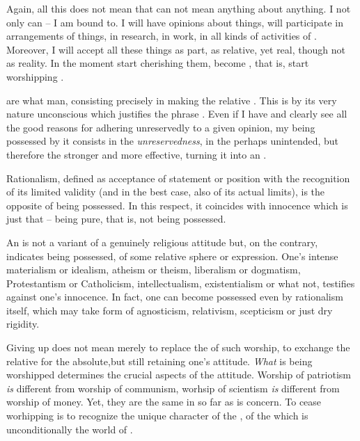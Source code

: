 Again, all this does not mean that  can not mean anything about
anything.  I not only can -- I am bound to.  I will have opinions about
things,  will participate in arrangements of things, in research,
in work, in all kinds of activities of . Moreover, I 
will accept all these things as  part, as relative, yet
 real, though not as  reality.  In the
moment  start cherishing them,  become
, that is,  start worshipping .

\pa {} are what  man, 
consisting precisely in making the relative .  This is
by its very nature unconscious which justifies the phrase .  Even if I have and clearly see all the good reasons for
adhering unreservedly to a given opinion, my being possessed by
it consists in the {\em unreservedness}, in the perhaps unintended,
but therefore the stronger and more effective, turning it into an
.

Rationalism, defined as acceptance of  statement or
position with the recognition of its limited validity (and in the best
case, also of its actual limits), is the opposite of being
possessed.  In this respect, it coincides with innocence which is 
just that -- being pure, that is, not being possessed. 

An  is not a variant of a genuinely religious attitude but,
on the contrary, indicates being possessed, of  some
relative sphere or expression.  One's intense materialism or idealism,
atheism or theism, liberalism or dogmatism, Protestantism or
Catholicism, intellectualism, existentialism or what not, testifies
against one's innocence.  In fact, one can become possessed even by
rationalism itself, which may take form of agnosticism, relativism,
scepticism or just dry rigidity.

Giving up  does not mean merely to replace the 
of such worship, to exchange the relative for the absolute,but still
retaining one's attitude.  {\em What} is being worshipped determines
the crucial aspects of the attitude.  Worship of patriotism {\em is}
different from worship of communism, worhsip of scientism {\em is} 
different from worship of money.  Yet, they are the same in so far
as  is concern.  To cease worhipping  is to
recognize the unique character of the , of the 
which is unconditionally  the world of .

